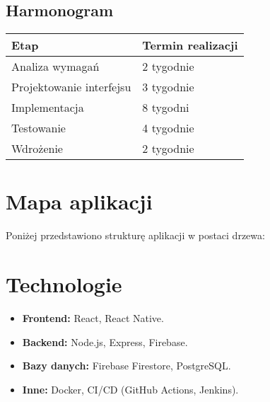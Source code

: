 \subsection{Harmonogram}
\begin{tabular}{|l|l|}
    \hline
    \textbf{Etap} & \textbf{Termin realizacji} \\
    \hline
    Analiza wymagań & 2 tygodnie \\
    \hline
    Projektowanie interfejsu & 3 tygodnie \\
    \hline
    Implementacja & 8 tygodni \\
    \hline
    Testowanie & 4 tygodnie \\
    \hline
    Wdrożenie & 2 tygodnie \\
    \hline
\end{tabular}

\section{Mapa aplikacji}
Poniżej przedstawiono strukturę aplikacji w postaci drzewa:

\begin{center}
\end{center}

\section{Technologie}
\begin{itemize}
    \item \textbf{Frontend:} React, React Native.
    \item \textbf{Backend:} Node.js, Express, Firebase.
    \item \textbf{Bazy danych:} Firebase Firestore, PostgreSQL.
    \item \textbf{Inne:} Docker, CI/CD (GitHub Actions, Jenkins).
\end{itemize}